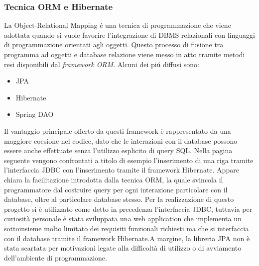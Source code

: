 \documentclass[12pt,a4paper,onecolumn,x11names]{article}
\begin{document}
	\subsubsection{Tecnica ORM e Hibernate}	
		La Object-Relational Mapping \'{e} una tecnica di programmazione che viene adottata quando si vuole favorire l'integrazione di DBMS relazionali con linguaggi di programmazione orientati agli oggetti. Questo processo di fusione tra programma ad oggetti e database relazione viene messo in atto tramite metodi resi disponibili dal \textit{framework ORM}. Alcuni dei pi\'{u} diffusi sono:
			\begin{itemize}
				\item JPA
				\item Hibernate
				\item Spring DAO
			\end{itemize}
		\begin{flushleft}
			Il vantaggio principale offerto da questi framework è rappresentato da una maggiore coesione nel codice, dato che le interazioni con il database possono essere anche effettuate senza l'utilizzo esplicito di query SQL. Nella pagina seguente vengono confrontati a titolo di esempio l'inserimento di una riga tramite l'interfaccia JDBC con l'inserimento tramite il framework Hibernate. Appare chiara la facilitazione introdotta dalla tecnica ORM, la quale svincola il programmatore dal costruire query per ogni interazione particolare con il database, oltre al particolare database stesso.\newline\newline
			Per la realizzazione di questo progetto si è utilizzato come detto in precedenza l'interfaccia JDBC, tuttavia per curiosità personale è stata sviluppata una web application che implementa un sottoinsieme molto limitato dei requisiti funzionali richiesti ma che si interfaccia con il database tramite il framework Hibernate.\newline A margine, la libreria JPA non è stata scartata per motivazioni legate alla difficoltà di utilizzo o di avviamento dell'ambiente di programmazione.  
		\end{flushleft}
		
\end{document}
